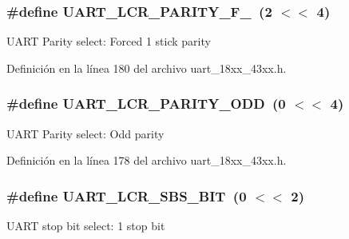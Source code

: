 \subsubsection[{\texorpdfstring{U\+A\+R\+T\+\_\+\+L\+C\+R\+\_\+\+P\+A\+R\+I\+T\+Y\+\_\+\+F\+\_\+1}{UART_LCR_PARITY_F_1}}]{\setlength{\rightskip}{0pt plus 5cm}\#define U\+A\+R\+T\+\_\+\+L\+C\+R\+\_\+\+P\+A\+R\+I\+T\+Y\+\_\+\+F\+\_~(2 $<$$<$ 4)}\hypertarget{group___u_a_r_t__18_x_x__43_x_x_ga17566959150e60563687a91817ddf844}{}\label{group___u_a_r_t__18_x_x__43_x_x_ga17566959150e60563687a91817ddf844}
U\+A\+RT Parity select\+: Forced 1 stick parity 

Definición en la línea 180 del archivo uart\+\_\+18xx\+\_\+43xx.\+h.

\subsubsection[{\texorpdfstring{U\+A\+R\+T\+\_\+\+L\+C\+R\+\_\+\+P\+A\+R\+I\+T\+Y\+\_\+\+O\+DD}{UART_LCR_PARITY_ODD}}]{\setlength{\rightskip}{0pt plus 5cm}\#define U\+A\+R\+T\+\_\+\+L\+C\+R\+\_\+\+P\+A\+R\+I\+T\+Y\+\_\+\+O\+DD~(0 $<$$<$ 4)}\hypertarget{group___u_a_r_t__18_x_x__43_x_x_ga5ef9bdb85d3f5c3823d667190b19bb40}{}\label{group___u_a_r_t__18_x_x__43_x_x_ga5ef9bdb85d3f5c3823d667190b19bb40}
U\+A\+RT Parity select\+: Odd parity 

Definición en la línea 178 del archivo uart\+\_\+18xx\+\_\+43xx.\+h.

\subsubsection[{\texorpdfstring{U\+A\+R\+T\+\_\+\+L\+C\+R\+\_\+\+S\+B\+S\+\_\+1\+B\+IT}{UART_LCR_SBS_1BIT}}]{\setlength{\rightskip}{0pt plus 5cm}\#define U\+A\+R\+T\+\_\+\+L\+C\+R\+\_\+\+S\+B\+S\+\_\+B\+IT~(0 $<$$<$ 2)}\hypertarget{group___u_a_r_t__18_x_x__43_x_x_ga70ccdedb76a079b8e7c87e5c3709469c}{}\label{group___u_a_r_t__18_x_x__43_x_x_ga70ccdedb76a079b8e7c87e5c3709469c}
U\+A\+RT stop bit select\+: 1 stop bit 

